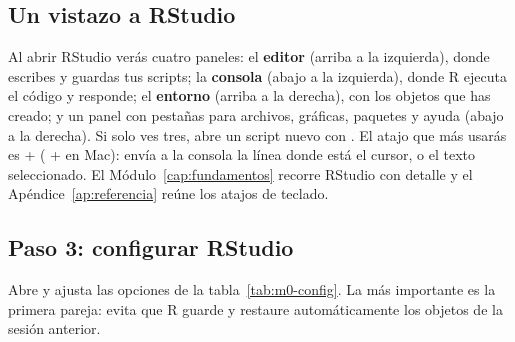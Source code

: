 \subsection{Un vistazo a RStudio}

Al abrir RStudio verás cuatro paneles: el \textbf{editor} (arriba a la
izquierda), donde escribes y guardas tus scripts; la \textbf{consola}
(abajo a la izquierda), donde R ejecuta el código y responde; el
\textbf{entorno} (arriba a la derecha), con los objetos que has creado; y
un panel con pestañas para archivos, gráficas, paquetes y ayuda (abajo a la
derecha). Si solo ves tres, abre un script nuevo con
. El atajo que más usarás es
 +  ( +  en Mac): envía a
la consola la línea donde está el cursor, o el texto seleccionado. El
Módulo~\ref{cap:fundamentos} recorre RStudio con detalle y el
Apéndice~\ref{ap:referencia} reúne los atajos de teclado.

\subsection{Paso 3: configurar RStudio}

Abre  y ajusta las opciones de la
tabla~\ref{tab:m0-config}. La más importante es la primera pareja: evita
que R guarde y restaure automáticamente los objetos de la sesión anterior.

